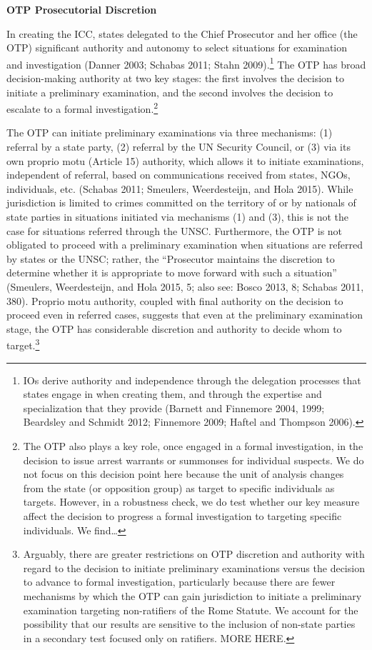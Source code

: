 \textbf{OTP Prosecutorial Discretion}

In creating the ICC, states delegated to the Chief Prosecutor and her office (the OTP) significant authority and autonomy to select situations for examination and investigation (Danner 2003; Schabas 2011; Stahn 2009).\footnote{IOs derive authority and independence through the delegation processes that states engage in when creating them, and through the expertise and specialization that they provide (Barnett and Finnemore 2004, 1999; Beardsley and Schmidt 2012; Finnemore 2009; Haftel and Thompson 2006).} The OTP has broad decision-making authority at two key stages: the first involves the decision to initiate a preliminary examination, and the second involves the decision to escalate to a formal investigation.\footnote{The OTP also plays a key role, once engaged in a formal investigation, in the decision to issue arrest warrants or summonses for individual suspects. We do not focus on this decision point here because the unit of analysis changes from the state (or opposition group) as target to specific individuals as targets. However, in a robustness check, we do test whether our key measure affect the decision to progress a formal investigation to targeting specific individuals. We find\ldots{}}

The OTP can initiate preliminary examinations via three mechanisms: (1) referral by a state party, (2) referral by the UN Security Council, or (3) via its own proprio motu (Article 15) authority, which allows it to initiate examinations, independent of referral, based on communications received from states, NGOs, individuals, etc. (Schabas 2011; Smeulers, Weerdesteijn, and Hola 2015). While jurisdiction is limited to crimes committed on the territory of or by nationals of state parties in situations initiated via mechanisms (1) and (3), this is not the case for situations referred through the UNSC. Furthermore, the OTP is not obligated to proceed with a preliminary examination when situations are referred by states or the UNSC; rather, the ``Prosecutor maintains the discretion to determine whether it is appropriate to move forward with such a situation'' (Smeulers, Weerdesteijn, and Hola 2015, 5; also see: Bosco 2013, 8; Schabas 2011, 380). Proprio motu authority, coupled with final authority on the decision to proceed even in referred cases, suggests that even at the preliminary examination stage, the OTP has considerable discretion and authority to decide whom to target.\footnote{Arguably, there are greater restrictions on OTP discretion and authority with regard to the decision to initiate preliminary examinations versus the decision to advance to formal investigation, particularly because there are fewer mechanisms by which the OTP can gain jurisdiction to initiate a preliminary examination targeting non-ratifiers of the Rome Statute. We account for the possibility that our results are sensitive to the inclusion of non-state parties in a secondary test focused only on ratifiers. MORE HERE.}

